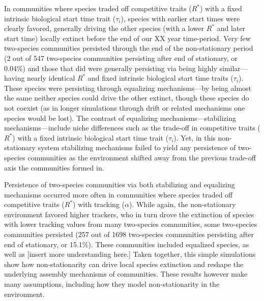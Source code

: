\documentclass[11pt,letterpaper]{article}
\begin{document}
In communities where species traded off competitive traits ($R^*$) with a fixed intrinsic biological start time trait ($\tau_i$), species with earlier start times were clearly favored, generally driving the other species (with a lower $R^*$ and later start time) locally extinct before the end of our XX year time-period. Very few two-species communities persisted through the end of the non-stationary period (2 out of 547 two-species communities persisting after end of stationary, or 0.04\%) and those that did were generally persisting via being highly similar---having nearly identical $R^*$ and fixed intrinsic biological start time traits ($\tau_i$). These species were persisting through equalizing mechanisms---by being almost the same neither species could drive the other extinct, though these species do not coexist (as in longer simulations through drift or related mechanisms one species would be lost). The contrast of equalizing mechanisms---stabilizing mechanisms---include niche differences such as the trade-off in competitive traits ($R^*$) with a fixed intrinsic biological start time trait ($\tau_i$). Yet, in this non-stationary system stabilizing mechanisms failed to yield any persistence of two-species communities as the environment shifted away from the previous trade-off axis the communities formed in. 

Persistence of two-species communities via both stabilizing and equalizing mechanisms occurred more often in communities where species traded off competitive traits ($R^*$) with tracking ($\alpha$). While again, the non-stationary environment favored higher trackers, who in turn drove the extinction of species with lower tracking values from many two-species communities, some two-species communities persisted (257 out of 1698 two-species communities persisting after end of stationary, or 15.1\%). These communities included equalized species, as well as [insert more understanding here.] Taken together, this simple simulations show how non-stationarity can drive local species extinction and reshape the underlying assembly mechanisms of communities. These results however make many assumptions, including how they model non-stationarity in the environment. 
\end{document}
